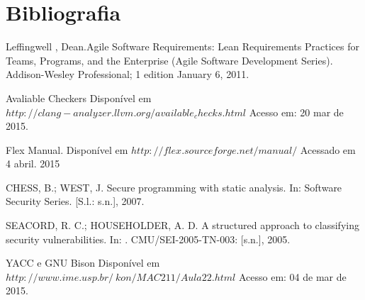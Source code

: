 \chapter[Bibliografia]{Bibliografia}
\par [1] Leffingwell , Dean.Agile Software Requirements: Lean Requirements Practices for Teams, Programs, and the Enterprise (Agile Software Development Series). Addison-Wesley Professional; 1 edition January 6, 2011.
\par [2] Avaliable Checkers Disponível em $http://clang-analyzer.llvm.org/available_ checks.html$ Acesso em: 20 mar de 2015.
\par [3] Flex Manual.  Disponível em $http://flex.sourceforge.net/manual/$ Acessado em 4 abril. 2015
\par [4] CHESS, B.; WEST, J. Secure programming with static analysis. In: Software Security
Series. [S.l.: s.n.], 2007.
\par [5] SEACORD, R. C.; HOUSEHOLDER, A. D. A structured approach to classifying
security vulnerabilities. In: . CMU/SEI-2005-TN-003: [s.n.], 2005.
\par [6] YACC e GNU Bison Disponível em $http://www.ime.usp.br/~kon/MAC211/Aula22.html$ Acesso em: 04 de mar de 2015.